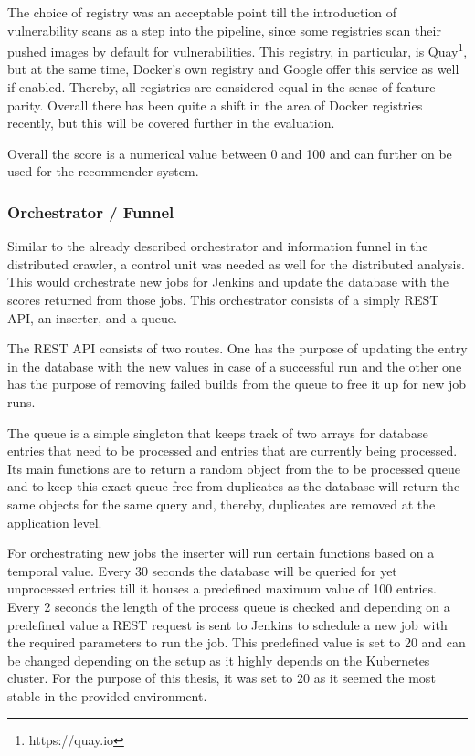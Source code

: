 The choice of registry was an acceptable point till the introduction of vulnerability scans as a step into the pipeline, since some registries scan their pushed images by default for vulnerabilities. This registry, in particular, is Quay\footnote{https://quay.io}, but at the same time, Docker's own registry and Google offer this service as well if enabled. Thereby, all registries are considered equal in the sense of feature parity. Overall there has been quite a shift in the area of Docker registries recently, but this will be covered further in the evaluation.  

Overall the score is a numerical value between 0 and 100 and can further on be used for the recommender system.

\subsubsection{Orchestrator / Funnel}
\label{sec:proxy}
Similar to the already described orchestrator and information funnel in the distributed crawler, a control unit was needed as well for the distributed analysis. This would orchestrate new jobs for Jenkins and update the database with the scores returned from those jobs. This orchestrator consists of a simply REST API, an inserter, and a queue.

The REST API consists of two routes. One has the purpose of updating the entry in the database with the new values in case of a successful run and the other one has the purpose of removing failed builds from the queue to free it up for new job runs.

The queue is a simple singleton that keeps track of two arrays for database entries that need to be processed and entries that are currently being processed. Its main functions are to return a random object from the to be processed queue and to keep this exact queue free from duplicates as the database will return the same objects for the same query and, thereby, duplicates are removed at the application level.

For orchestrating new jobs the inserter will run certain functions based on a temporal value. Every 30 seconds the database will be queried for yet unprocessed entries till it houses a predefined maximum value of 100 entries. Every 2 seconds the length of the process queue is checked and depending on a predefined value a REST request is sent to Jenkins to schedule a new job with the required parameters to run the job. This predefined value is set to 20 and can be changed depending on the setup as it highly depends on the Kubernetes cluster. For the purpose of this thesis, it was set to 20 as it seemed the most stable in the provided environment.

